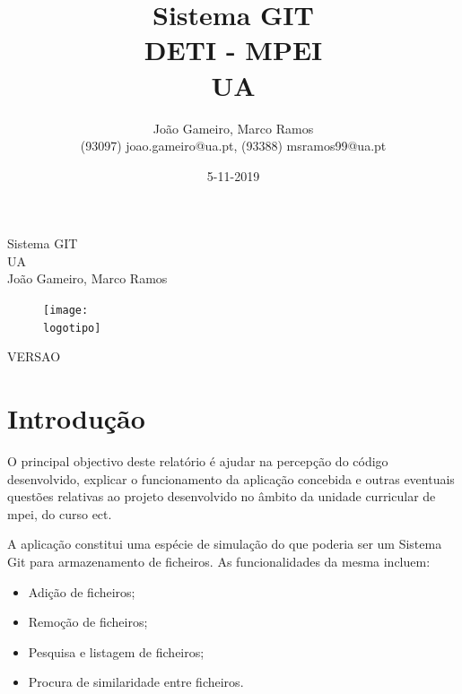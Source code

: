 \documentclass{report}
\begin{document}
%
\def\titulo{Sistema GIT}
\def\data{5-11-2019}
\def\autores{João Gameiro, Marco Ramos}
\def\autorescontactos{(93097) joao.gameiro@ua.pt, (93388) msramos99@ua.pt}
\def\versao{VERSAO}
\def\departamento{DETI - MPEI}
\def\empresa{UA}
\def\logotipo{ua.pdf}
%
%
\begin{titlepage}

\begin{center}
%
\vspace*{50mm}
%
{\Huge \titulo}\\ 
%
\vspace{10mm}
%
{\Large \empresa}\\
%
\vspace{10mm}
%
{\LARGE \autores}\\ 
%
\vspace{30mm}
%
\begin{figure}[h]
\center
\texttt{[image: \\logotipo]}
\end{figure}
%
\vspace{30mm}
\end{center}
%
\begin{flushright}
\versao
\end{flushright}
\end{titlepage}

\title{%
{\Huge\textbf{\titulo}}\\
{\Large \departamento\\ \empresa}
}
%
\author{%
    \autores \\
    \autorescontactos
}
%
\date{\data}
%
\maketitle





\chapter{Introdução}
\label{chap.introducao}

O principal objectivo deste relatório é ajudar na percepção do código desenvolvido, explicar o funcionamento da aplicação concebida e outras eventuais questões relativas ao projeto desenvolvido no âmbito da unidade curricular de \ac{mpei}, do curso \ac{ect}.

A aplicação constitui uma espécie de simulação do que poderia ser um Sistema Git para armazenamento de ficheiros. As funcionalidades da mesma incluem:
\begin{itemize}
   \item Adição de ficheiros;
   \item Remoção de ficheiros;
   \item Pesquisa e listagem de ficheiros;
   \item Procura de similaridade entre ficheiros.
 \end{itemize}
 
\end{document}
